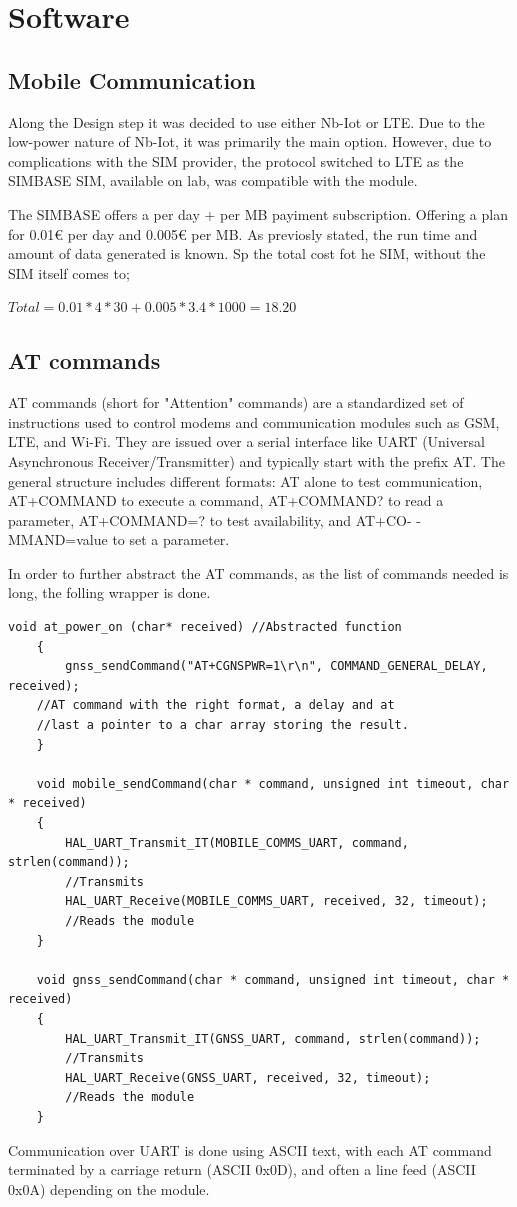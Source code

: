 \section{Software}
\subsection{Mobile Communication}
Along the Design step it was decided to use either Nb-Iot or LTE. Due to the low-power nature of Nb-Iot, 
it was primarily the main option. However, due to complications with the SIM provider, the protocol
switched to LTE as the SIMBASE SIM, available on lab, was compatible with the module. 

The SIMBASE offers a per day + per MB payiment subscription. Offering a plan for 0.01€ per day and 0.005€ per MB.
As previosly stated, the run time and amount of data generated is known. Sp the total cost fot he SIM, without the SIM itself
comes to;

\(Total = 0.01*4*30 + 0.005*3.4*1000 = 18.20\)

\subsection{AT commands}

AT commands (short for "Attention" commands) are a standardized set of instructions used to control modems
and communication modules such as GSM, LTE, and Wi-Fi. They are issued over a 
serial interface like UART (Universal Asynchronous Receiver/Transmitter) and typically start with the prefix
AT. The general structure includes different formats: AT alone to test communication, AT+COMMAND to execute
a command, AT+COMMAND? to read a parameter, AT+COMMAND=? to test availability, and AT+CO- 
-MMAND=value to set a parameter.

In order to further abstract the AT commands, as the list of commands needed is long, the folling wrapper is done.

\begin{lstlisting}[style=cStyle, caption={GNSS Power-On and Command Functions}]
    void at_power_on (char* received) //Abstracted function
    {
        gnss_sendCommand("AT+CGNSPWR=1\r\n", COMMAND_GENERAL_DELAY, received);
    //AT command with the right format, a delay and at 
    //last a pointer to a char array storing the result. 
    }
    
    void mobile_sendCommand(char * command, unsigned int timeout, char * received)
    {
        HAL_UART_Transmit_IT(MOBILE_COMMS_UART, command, strlen(command)); 
        //Transmits
        HAL_UART_Receive(MOBILE_COMMS_UART, received, 32, timeout); 
        //Reads the module
    }
    
    void gnss_sendCommand(char * command, unsigned int timeout, char * received)
    {
        HAL_UART_Transmit_IT(GNSS_UART, command, strlen(command)); 
        //Transmits
        HAL_UART_Receive(GNSS_UART, received, 32, timeout); 
        //Reads the module
    }
\end{lstlisting}
Communication over UART is done using ASCII text, with each AT command terminated by a 
carriage return (ASCII 0x0D), and often a line feed (ASCII 0x0A) depending on the module.

